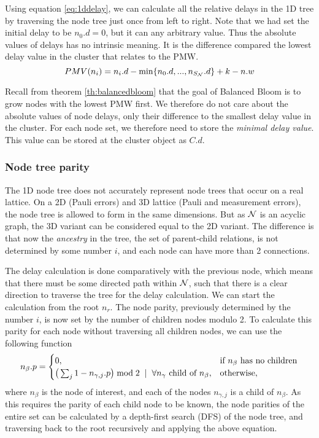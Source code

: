 Using equation \ref{eq:1ddelay}, we can calculate all the relative delays in the 1D tree by traversing the node tree just once from left to right. Note that we had set the initial delay to be $n_0.d=0$, but it can any arbitrary value. Thus the absolute values of delays has no intrinsic meaning. It is the difference compared the lowest delay value in the cluster that relates to the PMW.
\begin{equation}
  PMV(n_i) = n_i.d - \min \{n_0.d,...,n_{S_{\mathcal{N}}}.d\} + k - n.w 
\end{equation}




Recall from theorem \ref{th:balancedbloom} that the goal of Balanced Bloom is to grow nodes with the lowest PMW first. We therefore do not care about the absolute values of node delays, only their difference to the smallest delay value in the cluster. For each node set, we therefore need to store the \emph{minimal delay value}. This value can be stored at the cluster object as $C.d$.


\subsubsection{Node tree parity}

The 1D node tree does not accurately represent node trees that occur on a real lattice. On a 2D (Pauli errors) and 3D lattice (Pauli and measurement errors), the node tree is allowed to form in the same dimensions. But as $\mathcal{N}$ is an acyclic graph, the 3D variant can be considered equal to the 2D variant. The difference is that now the \emph{ancestry} in the tree, the set of parent-child relations, is not determined by some number $i$, and each node can have more than 2 connections.

The delay calculation is done comparatively with the previous node, which means that there must be some directed path within $\mathcal{N}$, such that there is a clear direction to traverse the tree for the delay calculation. We can start the calculation from the root $n_r$. The node parity, previously determined by the number $i$, is now set by the number of children nodes modulo 2. To calculate this parity for each node without traversing all children nodes, we can use the following function
\begin{equation}\label{eq:nodeparitypart}
  n_\beta.p =
  \begin{cases}
    0, & \mbox{if $n_\beta$ has no children}  \\
    \big( \sum_{j} 1-n_{\gamma,j}.p \big ) \bmod 2 \hspace{.2cm} | \hspace{.2cm} \forall n_\gamma \mbox{ child of } n_\beta, & \mbox{otherwise},
  \end{cases}
\end{equation}
where $n_\beta$ is the node of interest, and each of the nodes $n_{\gamma,j}$ is a child of $n_\beta$. As this requires the parity of each child node to be known, the node parities of the entire set can be calculated by a depth-first search (DFS) of the node tree, and traversing back to the root recursively and applying the above equation.

